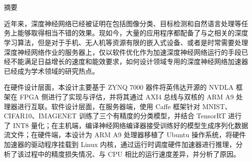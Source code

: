 \maketitle%
\chapter[摘要]{\MyTitleCh}
\setcounter{page}{1}%

\begin{center}
\vspace{-0.3cm}
 \songti 摘要
\vspace{0.3cm}
\end{center}

近年来，深度神经网络已经被证明在包括图像分类、目标检测和自然语言处理等任务上能够取得相当不错的效果。现如今，大量的应用程序都配备了与之相关的深度学习算法，但是对于手机、无人机等资源有限的嵌入式设备、或者是时常需要处理深度神经网络作业的服务器上，仅以软件优化作为加速深度神经网络运行的手段已经不能满足日益增长的速度和能效要求，如何设计领域专用的深度神经网络加速器已经成为学术领域的研究热点。

在硬件设计层面，本设计主要基于 ZYNQ 7000 器件将英伟达开源的 NVDLA 框架在 FPGA 侧进行了实现与评估，并将其通过 AXI4 总线与双核的 ARM A9 处理器进行互联。软件设计层面，在服务器端，使用 Caffe 框架针对 MNIST、CIFAR10、IMAGENET 训练了三个有精度的分类模型，并结合 TensorRT 进行了 INT8 量化；在主机端，编译神经网络编译器接受训练好的模型生成序列化数据流文件；在硬件端，本设计为 ARM A9 处理器移植了 Ubuntu 操作系统，将硬件加速器的驱动程序挂载到 Linux 内核，通过运行时调度硬件加速器进行推理，分析了该过程中的精度损失情况、与 CPU 相比的运行速度差异，并分析了原因。

{
}
